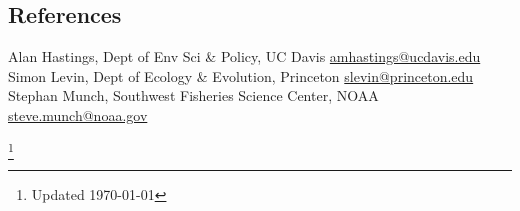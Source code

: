 \documentclass[margin]{res}
\begin{document}
\begin{resume}
\section{References}

Alan Hastings, Dept of Env Sci \& Policy, UC Davis \href{mailto:amhastings@ucdavis.edu}{amhastings@ucdavis.edu} \\ 
Simon Levin, Dept of Ecology \& Evolution, Princeton \href{mailto:slevin@princeton.edu}{slevin@princeton.edu} \\
Stephan Munch, Southwest Fisheries Science Center, NOAA \href{mailto:steve.munch@noaa.gov}{steve.munch@noaa.gov} \\




\end{resume}
\let\thefootnote\relax\footnote{Updated \today}
\end{document}
